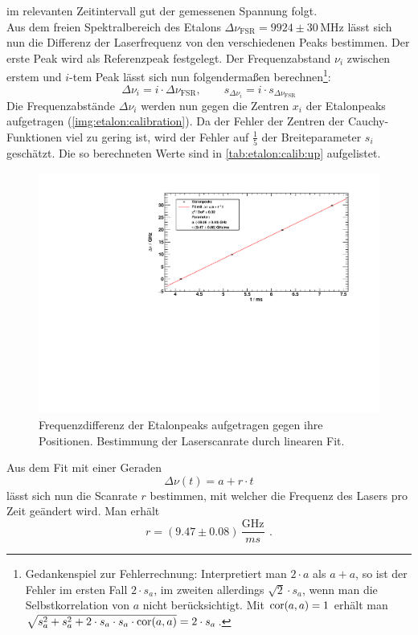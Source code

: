 im relevanten Zeitintervall gut der gemessenen Spannung folgt.\\
Aus dem freien Spektralbereich des Etalons $\Delta \nu_\text{FSR} = 9924 \pm 30\,\text{MHz}$ lässt sich nun die Differenz der Laserfrequenz von den verschiedenen
Peaks bestimmen. Der erste Peak wird als Referenzpeak festgelegt. Der Frequenzabstand $\nu_i$ zwischen erstem und $i$-tem Peak lässt sich nun
folgendermaßen berechnen\footnote{Gedankenspiel zur Fehlerrechnung: Interpretiert man $2 \cdot a$ als $a + a$, so ist der Fehler im ersten Fall $2 \cdot s_a$, im zweiten
allerdings $\sqrt{2} \cdot s_a$, wenn man die Selbstkorrelation von $a$ nicht berücksichtigt. Mit $\operatorname{cor}(a, a) = 1$
erhält man $\sqrt{s_a^2 + s_a^2 + 2 \cdot s_a \cdot s_a \cdot \operatorname{cor}(a, a)} = 2 \cdot s_a$.}:
\begin{equation}
    \Delta \nu_i = i \cdot \Delta \nu_\text{FSR}, \qquad s_{\Delta \nu_i} = i \cdot s_{\Delta \nu_\text{FSR}}
\end{equation}
Die Frequenzabstände $\Delta \nu_i$ werden nun gegen die Zentren $x_i$  der
Etalonpeaks aufgetragen (\autoref{img:etalon:calibration}). Da der Fehler der Zentren der Cauchy-Funktionen viel zu gering ist, wird der Fehler
auf $\frac{1}{5}$ der Breiteparameter $s_i$ geschätzt. Die so berechneten Werte sind in \autoref{tab:etalon:calib:up} aufgelistet.

\begin{figure}[H]
\begin{center}
    \includegraphics[width=\textwidth]{../img/part2/up-etalon_zoom-etalon_calibration.pdf}
    \caption{Frequenzdifferenz der Etalonpeaks aufgetragen gegen ihre Positionen. Bestimmung der Laserscanrate durch linearen Fit.}
    \label{img:etalon:calibration}
\end{center}
\end{figure}
Aus dem Fit mit einer Geraden
\begin{equation}
    \Delta \nu(t) = a + r \cdot t 
\end{equation}
lässt sich nun die Scanrate $r$ bestimmen, mit welcher die Frequenz des Lasers pro Zeit geändert wird. Man erhält
\begin{equation}
    r = (9.47 \pm 0.08)\,\frac{\text{GHz}}{ms}\ \, .
\end{equation}

